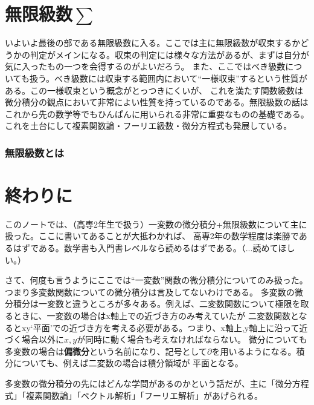 \documentclass[a4j,dvipdfmx]{jsarticle}
\begin{document}
    \part{無限級数$\sum$}
    \begin{screen}
        いよいよ最後の部である無限級数に入る。ここでは主に無限級数が収束するかどうかの判定がメインになる。収束の判定には様々な方法があるが、まずは自分が気に入ったもの一つを会得するのがよいだろう。
        また、ここではべき級数についても扱う。べき級数には収束する範囲内において``一様収束''するという性質がある。この一様収束という概念がとっつきにくいが、
        これを満たす関数級数は微分積分の観点において非常によい性質を持っているのである。無限級数の話はこれから先の数学等でもひんぱんに用いられる非常に重要なものの基礎である。
        これを土台にして複素関数論・フーリエ級数・微分方程式も発展している。
    \end{screen}
    \clearpage
        \section{無限級数とは}
    \clearpage
    \part{終わりに}
        このノートでは、（高専2年生で扱う）一変数の微分積分+無限級数について主に扱った。ここに書いてあることが大抵わかれば、
        高専2年の数学程度は楽勝であるはずである。数学書も入門書レベルなら読めるはずである。（...読めてほしい。）
        
        さて、何度も言うようにここでは``一変数''関数の微分積分についてのみ扱った。つまり多変数関数についての微分積分は言及してないわけである。
        多変数の微分積分は一変数と違うところが多々ある。例えば、二変数関数について極限を取るときに、一変数の場合はx軸上での近づき方のみ考えていたが
        二変数関数となるとxy`平面'での近づき方を考える必要がある。つまり、x軸上,y軸上に沿って近づく場合以外に$x,y$が同時に動く場合も考えなければならない。
        微分についても多変数の場合は\textbf{偏微分}という名前になり、記号として$\partial$を用いるようになる。積分についても、例えば二変数の場合は積分領域が
        平面となる。

        多変数の微分積分の先にはどんな学問があるのかという話だが、主に「微分方程式」「複素関数論」「ベクトル解析」「フーリエ解析」があげられる。\\
\end{document}
